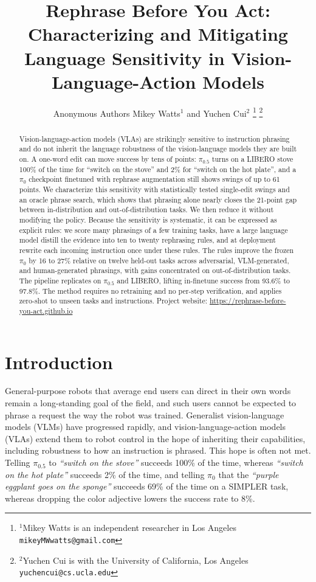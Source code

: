 \documentclass[letterpaper, 10 pt, conference]{ieeeconf} %
\title{\LARGE \bf
Rephrase Before You Act: Characterizing and Mitigating Language Sensitivity in Vision-Language-Action Models
}
\author{%
\ifanon
Anonymous Authors%
\else
Mikey Watts$^{1}$ and Yuchen Cui$^{2}$%
\thanks{$^{1}$Mikey Watts is an independent researcher in Los Angeles
{\tt\small mikeyMWwatts@gmail.com}}%
\thanks{$^{2}$Yuchen Cui is with the University of California, Los Angeles
{\tt\small yuchencui@cs.ucla.edu}}%
\fi
}
\newcommand{\projectsite}{https://rephrase-before-you-act.github.io}
\newcommand{\projectsite}{https://sttawm.github.io/rephrase-before-you-act}
\begin{document}
\maketitle

\thispagestyle{empty}
\pagestyle{empty}



\begin{abstract}
Vision-language-action models (VLAs) are strikingly sensitive to
instruction phrasing and do not inherit the language robustness of the
vision-language models they are built on. A one-word edit can move success by tens of points: $\pi_{0.5}$ turns on a LIBERO stove 100\% of the time for ``switch on the stove'' and 2\% for ``switch on the hot plate'', and a $\pi_0$ checkpoint finetuned with rephrase augmentation still shows swings of up to 61 points. We characterize this sensitivity
with statistically tested single-edit swings and an oracle phrase search,
which shows that phrasing alone nearly closes the 21-point gap between
in-distribution and out-of-distribution tasks. We then reduce it without
modifying the policy. Because the sensitivity is systematic, it can be expressed as explicit rules: we score many phrasings of a few training tasks, have a large language model distill the evidence into ten to twenty rephrasing rules, and at deployment rewrite each incoming instruction once under these rules. The rules improve the frozen $\pi_0$ by 16 to 27\% relative
on twelve held-out tasks across adversarial, VLM-generated, and
human-generated phrasings, with gains concentrated on out-of-distribution tasks. The pipeline replicates on $\pi_{0.5}$ and LIBERO, lifting
in-finetune success from 93.6\% to 97.8\%. The method requires no
retraining and no per-step verification, and applies zero-shot to unseen
tasks and instructions.
Project website:
\url{\projectsite}
\end{abstract}




\section{Introduction}

General-purpose robots that average end users can direct in their own words remain a long-standing goal of the field, and such users cannot be expected to phrase a request the way the robot was trained. Generalist vision-language models (VLMs) have progressed rapidly, and vision-language-action models (VLAs) extend them to robot control in the hope of inheriting their capabilities, including robustness to how an instruction is phrased. This hope is often not met. Telling $\pi_{0.5}$ to \textit{``switch on the stove''} succeeds 100\% of the time, whereas \textit{``switch on the hot plate''} succeeds 2\% of the time, and telling $\pi_0$ that the \textit{``purple eggplant goes on the sponge''} succeeds 69\% of the time on a SIMPLER task, whereas dropping the color adjective lowers the success rate to 8\%.
\end{document}
